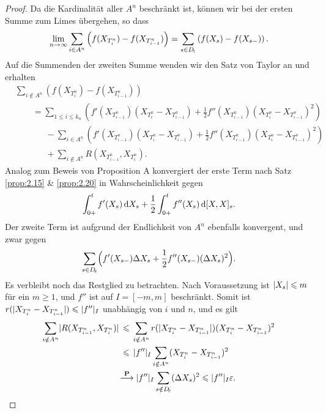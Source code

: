 \begin{proof}
Da die Kardinalität aller $A^n$ beschränkt ist, können wir bei der ersten Summe
zum Limes übergehen, so dass
\begin{align*}
\lim\limits_{n\to \infty} \sum_{i\in A^n}
\left(f(X_{T_{i}^n})-f(X_{T_{i-1}^n}) \right)
= \sum_{s\in D_{\!\varepsilon}}
\left(f(X_{s})-f(X_{s-}) \right).
\end{align*}
Auf die Summenden der zweiten Summe wenden wir den Satz von Taylor an und
erhalten
\begin{align*}
&\sum_{i\notin A^n} \left(f(X_{T_{i}^n})-f(X_{T_{i-1}^n})\right)\\ 
&\qquad= 
\sum_{1\le i\le k_n}\left( f'(X_{T_{i-1}^n})(X_{T_{i}^n}-X_{T_{i-1}^n})
+
\frac{1}{2}
f''(X_{T_{i-1}^n})(X_{T_{i}^n}-X_{T_{i-1}^n})^2\right)\\
&\qquad\quad\;\;-\sum_{i\in A^n}\left(
f'(X_{T_{i-1}^n})(X_{T_{i}^n}-X_{T_{i-1}^n}) +
\frac{1}{2} f''(X_{T_{i-1}^n})(X_{T_{i}^n}-X_{T_{i-1}^n})^2\right)\\
&\qquad\quad\;\;+
\sum_{i\notin A^n} R(X_{T_{i-1}^n},X_{T_{i}^n}).
\end{align*}
Analog zum Beweis von Proposition A konvergiert der erste Term nach
Satz \ref{prop:2.15} \& \ref{prop:2.20} in Wahrscheinlichkeit gegen
\begin{align*}
\int_{0+}^t f'(X_s)\,\mathrm{d} X_s + 
\frac{1}{2}\int_{0+}^t f''(X_s)\,\mathrm{d}[X,X]_s.
\end{align*}
Der zweite Term ist aufgrund der Endlichkeit von $A^n$ ebenfalls konvergent, und
zwar gegen
\begin{align*}
\sum_{s\in D_{\!\varepsilon}}
\Bigl(f'(X_{s-})\Delta X_s + \frac{1}{2}f''(X_{s-})(\Delta X_s)^2
\Bigr).
\end{align*}
Es verbleibt noch das Restglied zu betrachten.
Nach Voraussetzung ist $\lvert X_s\rvert\leqslant m$ für ein $m\ge 1$, und $f''$ ist
auf $I=[-m,m]$ beschränkt. Somit ist $r(\lvert X_{T_{i}^n}-X_{T_{i-1}^n}\rvert)
\leqslant \lvert f''\rvert_I$ unabhängig von $i$ und $n$, und es gilt
\begin{align*}
\sum_{i\notin A^n} \lvert R(X_{T_{i-1}^n},X_{T_{i}^n})\rvert
&\,\leqslant\,
\sum_{i\notin A^n}
r(\lvert X_{T_{i}^n}-X_{T_{i-1}^n}\rvert) (X_{T_{i}^n}-X_{T_{i-1}^n})^2\\
&\,\leqslant\, \lvert f''\rvert_I \sum_{i\notin A^n} (X_{T_{i}^n}-X_{T_{i-1}^n})^2\\
&\!\overset{\mathbf{P}}{\longrightarrow} \lvert f''\rvert_I\sum_{s\notin D_{\!\varepsilon}} (\Delta X_s)^2 \leqslant \lvert f''\rvert_I\varepsilon.
\end{align*}


\end{proof}
